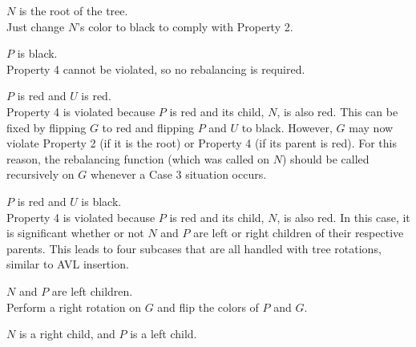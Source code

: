 \begin{description}[1cm]
    \item[\underline{Case 1}:] $N$ is the root of the tree. \\
    
    Just change $N$'s color to black to comply with Property 2. \\
    
    \item[\underline{Case 2}:] $P$ is black. \\
    
    Property 4 cannot be violated, so no rebalancing is required. \\
    
    \item[\underline{Case 3}:] $P$ is red and $U$ is red. \\
    
    Property 4 is violated because $P$ is red and its child, $N$, is also red. This can be fixed by flipping $G$ to red and flipping $P$ and $U$ to black. However, $G$ may now violate Property 2 (if it is the root) or Property 4 (if its parent is red). For this reason, the rebalancing function (which was called on $N$) should be called recursively on $G$ whenever a Case 3 situation occurs. \\
    
    \item[\underline{Case 4}:] $P$ is red and $U$ is black. \\
    
    Property 4 is violated because $P$ is red and its child, $N$, is also red. In this case, it is significant whether or not $N$ and $P$ are left or right children of their respective parents. This leads to four subcases that are all handled with tree rotations, similar to AVL insertion. \\
    
    \begin{description}[1cm]
        \item[\underline{Case 4.A}:] $N$ and $P$ are left children. \\
        
        Perform a right rotation on $G$ and flip the colors of $P$ and $G$. \\
        
        \item[\underline{Case 4.B}:] $N$ is a right child, and $P$ is a left child. \\
        

\end{description}
\end{description}
